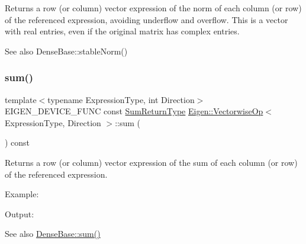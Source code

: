 \begin{DoxyReturn}{Returns}
a row (or column) vector expression of the norm of each column (or row) of the referenced expression, avoiding underflow and overflow. This is a vector with real entries, even if the original matrix has complex entries.
\end{DoxyReturn}
\begin{DoxySeeAlso}{See also}
Dense\+Base\+::stable\+Norm() 
\end{DoxySeeAlso}
\mbox{\label{class_eigen_1_1_vectorwise_op_a2005154bdb90789c0eb55343be9694c1}} 
\subsubsection{\texorpdfstring{sum()}{sum()}}
{\footnotesize\ttfamily template$<$typename Expression\+Type, int Direction$>$ \\
E\+I\+G\+E\+N\+\_\+\+D\+E\+V\+I\+C\+E\+\_\+\+F\+U\+NC const \mbox{\hyperlink{class_eigen_1_1_partial_redux_expr}{Sum\+Return\+Type}} \mbox{\hyperlink{class_eigen_1_1_vectorwise_op}{Eigen\+::\+Vectorwise\+Op}}$<$ Expression\+Type, Direction $>$\+::sum (\begin{DoxyParamCaption}{ }\end{DoxyParamCaption}) const\hspace{0.3cm}{\ttfamily [inline]}}

\begin{DoxyReturn}{Returns}
a row (or column) vector expression of the sum of each column (or row) of the referenced expression.
\end{DoxyReturn}
Example\+: 
\begin{DoxyCodeInclude}{0}
\end{DoxyCodeInclude}
 Output\+: 
\begin{DoxyVerbInclude}
\end{DoxyVerbInclude}


\begin{DoxySeeAlso}{See also}
\mbox{\hyperlink{class_eigen_1_1_dense_base_a4dee689c76ff86da9d8e49950604597b}{Dense\+Base\+::sum()}} 
\end{DoxySeeAlso}


